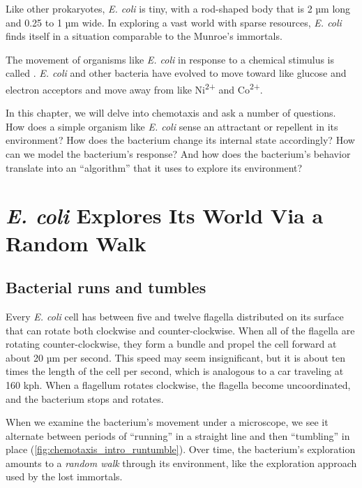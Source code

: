 Like other prokaryotes, \textit{E. coli} is tiny, with a rod-shaped body that is 2 µm long and 0.25 to 1 µm wide. In exploring a vast world with sparse resources, \textit{E. coli} finds itself in a situation comparable to the Munroe's immortals.

The movement of organisms like \textit{E. coli} in response to a chemical stimulus is called . \textit{E. coli} and other bacteria have evolved to move toward  like glucose and electron acceptors and move away from  like Ni\textsuperscript{2+} and Co\textsuperscript{2+}.

In this chapter, we will delve into chemotaxis and ask a number of questions. How does a simple organism like \textit{E. coli} sense an attractant or repellent in its environment? How does the bacterium change its internal state accordingly? How can we model the bacterium's response? And how does the bacterium's behavior translate into an ``algorithm'' that it uses to explore its environment?\\

\FloatBarrier
{}
\section{\textit{E. coli} Explores Its World Via a Random Walk}
\label{sec:e_coli_explores_its_world_via_a_random_walk}

\subsection{Bacterial runs and tumbles}

Every \textit{E. coli} cell has between five and twelve flagella distributed on its surface that can rotate both clockwise and counter-clockwise. When all of the flagella are rotating counter-clockwise, they form a bundle and propel the cell forward at about 20 µm per second. This speed may seem insignificant, but it is about ten times the length of the cell per second, which is analogous to a car traveling at 160 kph. When a flagellum rotates clockwise, the flagella become uncoordinated, and the bacterium stops and rotates.

When we examine the bacterium's movement under a microscope, we see it alternate between periods of ``running'' in a straight line and then ``tumbling'' in place (\autoref{fig:chemotaxis_intro_runtumble}). Over time, the bacterium's  exploration amounts to a \textit{random walk} through its environment, like the exploration approach used by the lost immortals.\\


